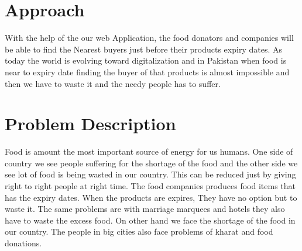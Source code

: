 \section{Approach}
With the help of the our web Application, the food donators and companies will be able to find the Nearest buyers just before their products expiry dates. As today the world is evolving toward digitalization and in Pakistan when food is near to expiry date finding the buyer of that products is almost impossible and then we have to waste it and the needy people has to suffer.
\section{Problem Description}
Food is amount the most important source of energy for us humans. One side of country we see people suffering for the shortage of the food and the other side we see lot of food is being wasted in our country. This can be reduced just by giving right to right people at right time. The food companies produces food items that has the expiry dates. When the products are expires, They have no option but to waste it. The same problems are with marriage marquees and hotels they also have to waste the excess food. On other hand we face the shortage of the food in our country. The people in big cities also face problems of kharat and food donations.